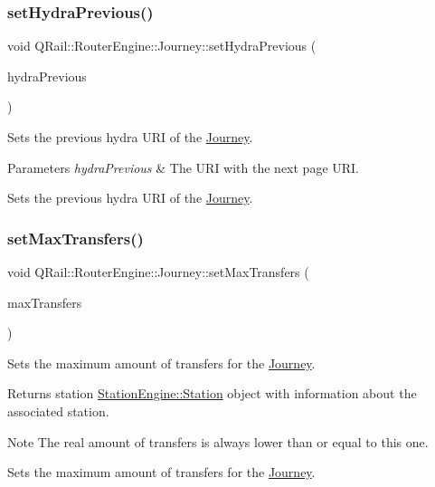 \subsubsection{\texorpdfstring{setHydraPrevious()}{setHydraPrevious()}}
{\footnotesize\ttfamily void Q\+Rail\+::\+Router\+Engine\+::\+Journey\+::set\+Hydra\+Previous (\begin{DoxyParamCaption}\item[{const Q\+Url \&}]{hydra\+Previous }\end{DoxyParamCaption})}



Sets the previous hydra U\+RI of the \mbox{\hyperlink{classQRail_1_1RouterEngine_1_1Journey}{Journey}}. 


\begin{DoxyParams}{Parameters}
{\em hydra\+Previous} & The U\+RI with the next page U\+RI.\\
\hline
\end{DoxyParams}
Sets the previous hydra U\+RI of the \mbox{\hyperlink{classQRail_1_1RouterEngine_1_1Journey}{Journey}}. \mbox{\label{classQRail_1_1RouterEngine_1_1Journey_ae05e37a29d946f407d3e85e44665b420}} 
\subsubsection{\texorpdfstring{setMaxTransfers()}{setMaxTransfers()}}
{\footnotesize\ttfamily void Q\+Rail\+::\+Router\+Engine\+::\+Journey\+::set\+Max\+Transfers (\begin{DoxyParamCaption}\item[{const qint16 \&}]{max\+Transfers }\end{DoxyParamCaption})}



Sets the maximum amount of transfers for the \mbox{\hyperlink{classQRail_1_1RouterEngine_1_1Journey}{Journey}}. 

\begin{DoxyReturn}{Returns}
station \mbox{\hyperlink{classQRail_1_1StationEngine_1_1Station}{Station\+Engine\+::\+Station}} object with information about the associated station. 
\end{DoxyReturn}
\begin{DoxyNote}{Note}
The real amount of transfers is always lower than or equal to this one.
\end{DoxyNote}
Sets the maximum amount of transfers for the \mbox{\hyperlink{classQRail_1_1RouterEngine_1_1Journey}{Journey}}. \mbox{\label{classQRail_1_1RouterEngine_1_1Journey_a99468617b683a7f07de157b30d1b9048}} 
